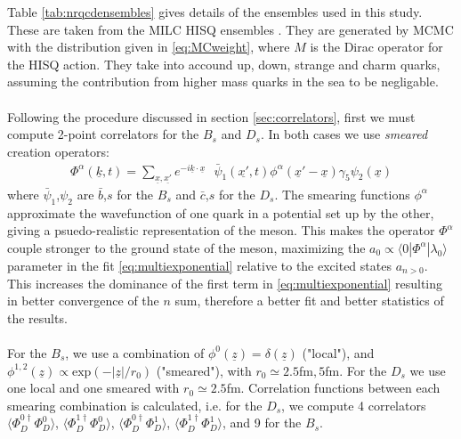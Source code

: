 Table \ref{tab:nrqcdensembles} gives details of the ensembles used in this study. These are taken from the MILC HISQ ensembles \cite{Bazavov:2012xda}. They are generated by MCMC with the distribution given in \eqref{eq:MCweight}, where $M$ is the Dirac operator for the HISQ action. They take into accound up, down, strange and charm quarks, assuming the contribution from higher mass quarks in the sea to be negligable.
\\ \\
Following the procedure discussed in section \ref{sec:correlators}, first we must compute 2-point correlators for the $B_s$ and $D_s$. In both cases we use \textit{smeared} creation operators:
\begin{align}
	\Phi^{\alpha}(\underline{k},t) = \sum_{\underline{x},\underline{x'}} e^{-i\underline{k}\cdot\underline{x}} \text{ } \bar{\psi}_1(\underline{x'},t)\phi^{\alpha}(\underline{x}'-\underline{x}) \gamma_5 \psi_2(\underline{x})
\end{align}
where $\bar{\psi}_1$,$\psi_2$ are $\bar{b}$,$s$ for the $B_s$ and $\bar{c}$,$s$ for the $D_s$. The smearing functions $\phi^{\alpha}$ approximate the wavefunction of one quark in a potential set up by the other, giving a psuedo-realistic representation of the meson. This makes the operator $\Phi^{\alpha}$ couple stronger to the ground state of the meson, maximizing the $a_0 \propto \langle0 |\Phi^{\alpha}|\lambda_0\rangle$ parameter in the fit \eqref{eq:multiexponential} relative to the excited states $a_{n>0}$. This increases the dominance of the first term in \eqref{eq:multiexponential} resulting in better convergence of the $n$ sum, therefore a better fit and better statistics of the results.
\\ \\
For the $B_s$, we use a combination of $\phi^0(\underline{z})=\delta(\underline{z})$ ("local"), and $\phi^{1,2}(\underline{z}) \propto \text{exp}(-|\underline{z}|/r_0)$ ("smeared"), with $r_0 \simeq 2.5$fm$, 5$fm. For the $D_s$ we use one local and one smeared with $r_0\simeq2.5$fm. Correlation functions between each smearing combination is calculated, i.e. for the $D_s$, we compute 4 correlators $\langle \Phi^{0\dagger}_D\Phi_D^0 \rangle$, $\langle \Phi^{1\dagger}_D\Phi_D^0 \rangle$, $\langle \Phi^{0\dagger}_D\Phi_D^1 \rangle$, $\langle \Phi^{1\dagger}_D\Phi_D^1 \rangle$, and 9 for the $B_s$.
\\ \\
